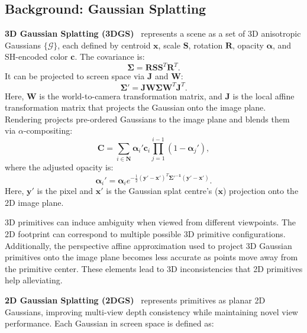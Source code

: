 \subsection{Background: Gaussian Splatting}
\label{subsec:method_gs}
\textbf{3D Gaussian Splatting (3DGS)}~\cite{kerbl20233d} represents a scene as a set of 3D anisotropic Gaussians \( \{ \mathcal{G} \} \), each defined by centroid \( \mathbf{x} \), scale \( \mathbf{S} \), rotation \( \mathbf{R} \), opacity \( \mathbf{\alpha} \), and SH-encoded color \( \mathbf{c} \). The covariance is:  
\begin{equation}
  \mathbf{\Sigma} = \mathbf{R} \mathbf{S} \mathbf{S}^T \mathbf{R}^T.
\end{equation} 
It can be projected to screen space via \( \mathbf{J} \) and \( \mathbf{W} \):  
\begin{equation}
  \mathbf{\Sigma'} = \mathbf{J} \mathbf{W} \mathbf{\Sigma} \mathbf{W}^T \mathbf{J}^T.
\end{equation}
Here, \( \mathbf{W} \) is the world-to-camera transformation matrix, and \( \mathbf{J} \) is the local affine transformation matrix that projects the Gaussian onto the image plane. Rendering projects pre-ordered Gaussians to the image plane and blends them via \( \alpha \)-compositing:  
\begin{equation}
\label{eq:alpha_blend}
 \mathbf{C} = \sum_{i \in \mathbf{N}} \mathbf{\alpha}_i' \mathbf{c}_i \prod_{j=1}^{i-1}(1-\mathbf{\alpha}_j'),
\end{equation} 
where the adjusted opacity is:  
\begin{equation}
\label{eq:alpha_mod}
\mathbf{\alpha}_i' = \mathbf{\alpha}_i e^{-\frac{1}{2}(\mathbf{y'}-\mathbf{x'})^T \mathbf{\Sigma'^{-1}}(\mathbf{y'}-\mathbf{x'})}.
\end{equation} 
Here, \(\mathbf{y'}\) is the pixel and \(\mathbf{x'}\) is the Gaussian splat centre's ($\mathbf{x}$) projection onto the 2D image plane.

3D primitives can induce ambiguity when viewed from different viewpoints. The 2D footprint can correspond to multiple possible 3D primitive configurations. Additionally, the perspective affine approximation used to project 3D Gaussian primitives onto the image plane becomes less accurate as points move away from the primitive center. These elements lead to 3D inconsistencies that 2D primitives help alleviating. 

\noindent \textbf{2D Gaussian Splatting (2DGS)}~\cite{huang20242d} represents primitives as planar 2D Gaussians, improving multi-view depth consistency while maintaining novel view performance. Each Gaussian in screen space is defined as:

